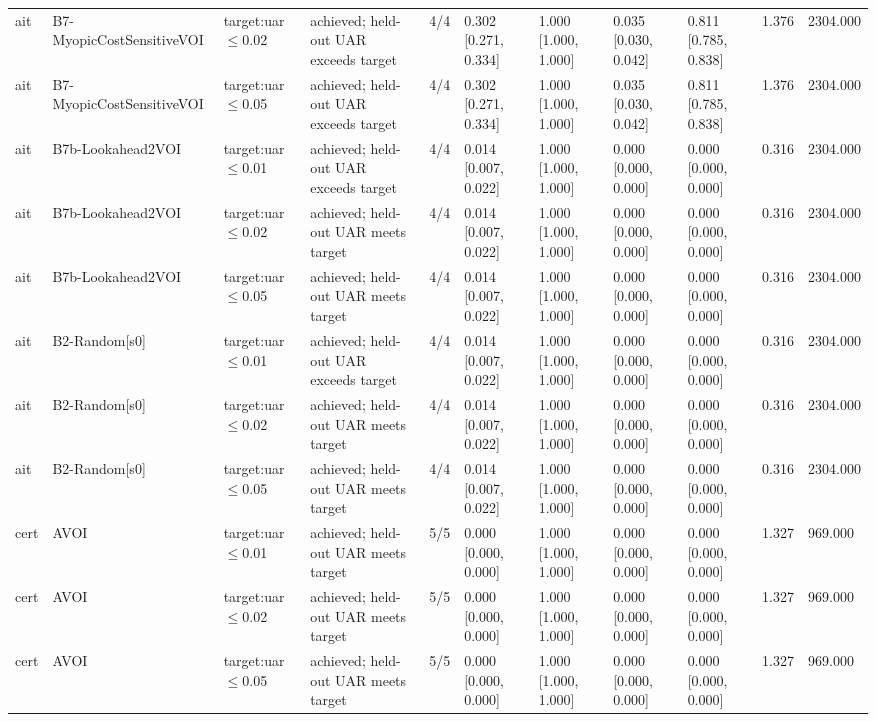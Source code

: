 \begin{table}[!ht]
{\begin{tabular}{lllllllllll}
ait & B7-MyopicCostSensitiveVOI & target:uar$\le$0.02 & achieved; held-out UAR exceeds target & 4/4 & 0.302 [0.271, 0.334] & 1.000 [1.000, 1.000] & 0.035 [0.030, 0.042] & 0.811 [0.785, 0.838] & 1.376 & 2304.000 \\
ait & B7-MyopicCostSensitiveVOI & target:uar$\le$0.05 & achieved; held-out UAR exceeds target & 4/4 & 0.302 [0.271, 0.334] & 1.000 [1.000, 1.000] & 0.035 [0.030, 0.042] & 0.811 [0.785, 0.838] & 1.376 & 2304.000 \\
ait & B7b-Lookahead2VOI & target:uar$\le$0.01 & achieved; held-out UAR exceeds target & 4/4 & 0.014 [0.007, 0.022] & 1.000 [1.000, 1.000] & 0.000 [0.000, 0.000] & 0.000 [0.000, 0.000] & 0.316 & 2304.000 \\
ait & B7b-Lookahead2VOI & target:uar$\le$0.02 & achieved; held-out UAR meets target & 4/4 & 0.014 [0.007, 0.022] & 1.000 [1.000, 1.000] & 0.000 [0.000, 0.000] & 0.000 [0.000, 0.000] & 0.316 & 2304.000 \\
ait & B7b-Lookahead2VOI & target:uar$\le$0.05 & achieved; held-out UAR meets target & 4/4 & 0.014 [0.007, 0.022] & 1.000 [1.000, 1.000] & 0.000 [0.000, 0.000] & 0.000 [0.000, 0.000] & 0.316 & 2304.000 \\
ait & B2-Random[s0] & target:uar$\le$0.01 & achieved; held-out UAR exceeds target & 4/4 & 0.014 [0.007, 0.022] & 1.000 [1.000, 1.000] & 0.000 [0.000, 0.000] & 0.000 [0.000, 0.000] & 0.316 & 2304.000 \\
ait & B2-Random[s0] & target:uar$\le$0.02 & achieved; held-out UAR meets target & 4/4 & 0.014 [0.007, 0.022] & 1.000 [1.000, 1.000] & 0.000 [0.000, 0.000] & 0.000 [0.000, 0.000] & 0.316 & 2304.000 \\
ait & B2-Random[s0] & target:uar$\le$0.05 & achieved; held-out UAR meets target & 4/4 & 0.014 [0.007, 0.022] & 1.000 [1.000, 1.000] & 0.000 [0.000, 0.000] & 0.000 [0.000, 0.000] & 0.316 & 2304.000 \\
cert & AVOI & target:uar$\le$0.01 & achieved; held-out UAR meets target & 5/5 & 0.000 [0.000, 0.000] & 1.000 [1.000, 1.000] & 0.000 [0.000, 0.000] & 0.000 [0.000, 0.000] & 1.327 & 969.000 \\
cert & AVOI & target:uar$\le$0.02 & achieved; held-out UAR meets target & 5/5 & 0.000 [0.000, 0.000] & 1.000 [1.000, 1.000] & 0.000 [0.000, 0.000] & 0.000 [0.000, 0.000] & 1.327 & 969.000 \\
cert & AVOI & target:uar$\le$0.05 & achieved; held-out UAR meets target & 5/5 & 0.000 [0.000, 0.000] & 1.000 [1.000, 1.000] & 0.000 [0.000, 0.000] & 0.000 [0.000, 0.000] & 1.327 & 969.000 \\

\end{tabular}}
\end{table}
